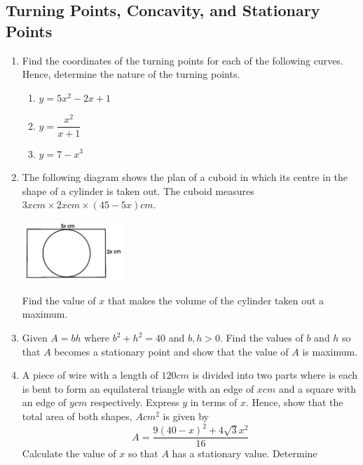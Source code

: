 \documentclass{report}
\begin{document}
\begin{multicols}{2}
      \subsection{Turning Points, Concavity, and Stationary Points}
      \begin{enumerate}
            \item Find the coordinates of the turning points for each of the following curves.
                  Hence, determine the nature of the turning points.
                  \begin{enumerate}
                        \item $y = 5x^2 - 2x + 1$
                        \item $y = \dfrac{x^2}{x+1}$
                        \item $y = 7 - x^3$
                  \end{enumerate}
            \item The following diagram shows the plan of a cuboid in which its centre in the
                  shape of a cylinder is taken out. The cuboid measures $3x\textit{cm} \times
                        2x\textit{cm} \times (45 - 5x)\textit{cm}$.
                  \begin{center}
                        \includegraphics[width=0.3\textwidth]{./images/q30.jpeg}
                  \end{center}
                  Find the value of $x$ that makes the volume of the cylinder taken out a maximum.
            \item Given $A = bh$ where $b^2 + h^2 = 40$ and $b, h > 0$. Find the values of $b$
                  and $h$ so that $A$ becomes a stationary point and show that the value of $A$
                  is maximum.
            \item A piece of wire with a length of $120\textit{cm}$ is divided into two parts
                  where is each is bent to form an equilateral triangle with an edge of
                  $x\textit{cm}$ and a square with an edge of $y\textit{cm}$ respectively.
                  Express $y$ in terms of $x$. Hence, show that the total area of both shapes,
                  $A\textit{cm}^2$ is given by
                  \[A = \dfrac{9{(40 - x)}^2 + 4\sqrt{3}x^2}{16}\]
                  Calculate the value of $x$ so that $A$ has a stationary value. Determine

\end{enumerate}
\end{multicols}
\end{document}
